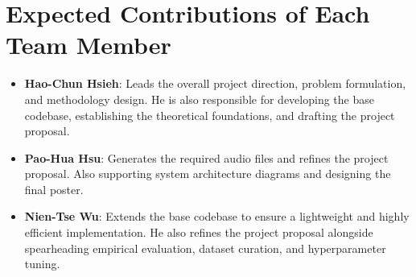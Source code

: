 \section{Expected Contributions of Each Team Member}
\begin{itemize}
    \item \textbf{Hao-Chun Hsieh}: Leads the overall project direction, problem formulation, and methodology design. He is also responsible for developing the base codebase, establishing the theoretical foundations, and drafting the project proposal.
    \item \textbf{Pao-Hua Hsu}: Generates the required audio files and refines the project proposal. Also supporting system architecture diagrams and designing the final poster.
    \item \textbf{Nien-Tse Wu}: Extends the base codebase to ensure a lightweight and highly efficient implementation. He also refines the project proposal alongside spearheading empirical evaluation, dataset curation, and hyperparameter tuning.
\end{itemize}
